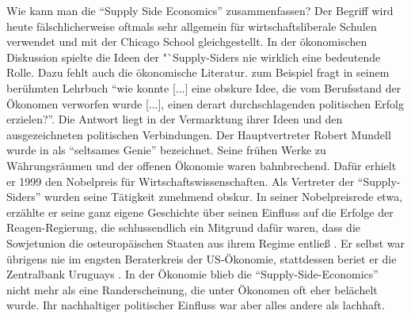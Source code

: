 Wie kann man die "`Supply Side Economics"' zusammenfassen? Der Begriff wird heute fälschlicherweise oftmals sehr allgemein für wirtschaftsliberale Schulen verwendet und mit der Chicago School gleichgestellt. In der ökonomischen Diskussion spielte die Ideen der "`Supply-Siders nie wirklich eine bedeutende Rolle. Dazu fehlt auch die ökonomische Literatur. \textcite[S. 377]{Samuelson1998} zum Beispiel fragt in seinem berühmten Lehrbuch "`wie konnte [...] eine obskure Idee, die vom Berufsstand der Ökonomen verworfen wurde [...], einen derart durchschlagenden politischen Erfolg erzielen?"'. Die Antwort liegt in der Vermarktung ihrer Ideen und den ausgezeichneten politischen Verbindungen.
Der Hauptvertreter Robert Mundell wurde in \textcite{Warsh} als "`seltsames Genie"' bezeichnet. Seine frühen Werke zu Währungsräumen und der offenen Ökonomie waren bahnbrechend. Dafür erhielt er 1999 den Nobelpreis für Wirtschaftswissenschaften. Als Vertreter der "`Supply-Siders"' wurden seine Tätigkeit zunehmend obskur. In seiner Nobelpreisrede etwa, erzählte er seine ganz eigene Geschichte über seinen Einfluss auf die Erfolge der Reagen-Regierung, die schlussendlich ein Mitgrund dafür waren, dass die Sowjetunion die osteuropäischen Staaten aus ihrem Regime entließ \parencite[S. 337]{Mundell1999}. Er selbst war übrigens nie im engsten Beraterkreis der US-Ökonomie, stattdessen beriet er die Zentralbank Uruguays \parencite[S. 195]{Warsh}.
In der Ökonomie blieb die "`Supply-Side-Economics"' nicht mehr als eine Randerscheinung, die unter Ökonomen oft eher belächelt wurde. Ihr nachhaltiger politischer Einfluss war aber alles andere als lachhaft.













